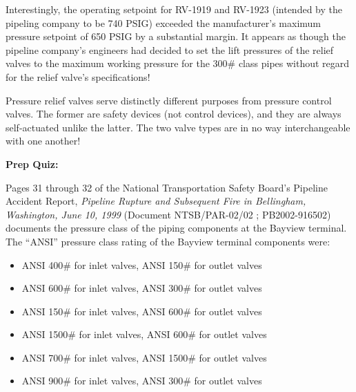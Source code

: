 Interestingly, the operating setpoint for RV-1919 and RV-1923 (intended by the pipeling company to be 740 PSIG) exceeded the manufacturer's maximum pressure setpoint of 650 PSIG by a substantial margin.  It appears as though the pipeline company's engineers had decided to set the lift pressures of the relief valves to the maximum working pressure for the 300\# class pipes without regard for the relief valve's specifications!

\vskip 10pt

Pressure relief valves serve distinctly different purposes from pressure control valves.  The former are safety devices (not control devices), and they are always self-actuated unlike the latter.  The two valve types are in no way interchangeable with one another!


\vfil \eject

\noindent
{\bf Prep Quiz:}

Pages 31 through 32 of the National Transportation Safety Board's Pipeline Accident Report, {\it Pipeline Rupture and Subsequent Fire in Bellingham, Washington, June 10, 1999} (Document NTSB/PAR-02/02 ; PB2002-916502) documents the pressure class of the piping components at the Bayview terminal.  The ``ANSI'' pressure class rating of the Bayview terminal components were:

\begin{itemize}
\item{} ANSI 400\# for inlet valves, ANSI 150\# for outlet valves
\vskip 5pt 
\item{} ANSI 600\# for inlet valves, ANSI 300\# for outlet valves
\vskip 5pt 
\item{} ANSI 150\# for inlet valves, ANSI 600\# for outlet valves
\vskip 5pt 
\item{} ANSI 1500\# for inlet valves, ANSI 600\# for outlet valves
\vskip 5pt 
\item{} ANSI 700\# for inlet valves, ANSI 1500\# for outlet valves
\vskip 5pt 
\item{} ANSI 900\# for inlet valves, ANSI 300\# for outlet valves
\end{itemize}




